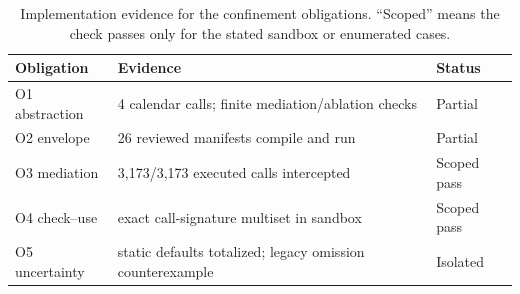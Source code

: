 \begin{table}[t]
\centering
\small
\caption{Implementation evidence for the confinement obligations. ``Scoped'' means the check passes only for the stated sandbox or enumerated cases.}
\label{tab:e80-obligations}
\begin{tabular}{@{}p{}p{}p{}@{}}
\toprule
Obligation & Evidence & Status \\
\midrule
O1 abstraction & 4 calendar calls; finite mediation/ablation checks & Partial \\
O2 envelope & 26 reviewed manifests compile and run & Partial \\
O3 mediation & 3,173/3,173 executed calls intercepted & Scoped pass \\
O4 check--use & exact call-signature multiset in sandbox & Scoped pass \\
O5 uncertainty & static defaults totalized; legacy omission counterexample & Isolated \\
\bottomrule
\end{tabular}
\end{table}
